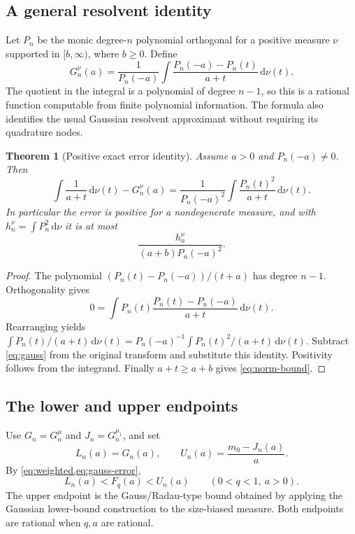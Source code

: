 \documentclass[11pt,a4paper]{article}
\newtheorem{theorem}{Theorem}[section]
\theoremstyle{remark}\newtheorem{remark}[theorem]{Remark}
\newcommand{\dd}{\,\mathrm d}
\begin{document}
\subsection{A general resolvent identity}

Let $P_n$ be the monic degree-$n$ polynomial orthogonal for a positive measure
$\nu$ supported in $[b,\infty)$, where $b\geq0$. Define
\begin{equation}
 G_n^{\nu}(a)=\frac1{P_n(-a)}
 \int\frac{P_n(-a)-P_n(t)}{a+t}\dd\nu(t).
 \label{eq:gauss}
\end{equation}
The quotient in the integral is a polynomial of degree $n-1$, so this is a
rational function computable from finite polynomial information. The formula
also identifies the usual Gaussian resolvent approximant without requiring
its quadrature nodes.

\begin{theorem}[Positive exact error identity]
Assume $a>0$ and $P_n(-a)\ne0$. Then
\begin{equation}
 \int\frac1{a+t}\dd\nu(t)-G_n^{\nu}(a)
 =\frac1{P_n(-a)^2}\int\frac{P_n(t)^2}{a+t}\dd\nu(t).
 \label{eq:gauss-error}
\end{equation}
In particular the error is positive for a nondegenerate measure, and with
$h_n^{\nu}=\int P_n^2\dd\nu$ it is at most
\begin{equation}
 \frac{h_n^{\nu}}{(a+b)P_n(-a)^2}.
 \label{eq:norm-bound}
\end{equation}
\end{theorem}
\begin{proof}
The polynomial $(P_n(t)-P_n(-a))/(t+a)$ has degree $n-1$. Orthogonality gives
\[
 0=\int P_n(t)\frac{P_n(t)-P_n(-a)}{a+t}\dd\nu(t).
\]
Rearranging yields
$\int P_n(t)/(a+t)\dd\nu(t)=
 P_n(-a)^{-1}\int P_n(t)^2/(a+t)\dd\nu(t)$.
Subtract \cref{eq:gauss} from the original transform and substitute this
identity. Positivity follows from the integrand. Finally $a+t\geq a+b$
gives \cref{eq:norm-bound}.
\end{proof}

\subsection{The lower and upper endpoints}

Use $G_n=G_n^{\mu}$ and $J_n=G_n^{\mu_1}$, and set
\begin{equation}
 L_n(a)=G_n(a),\qquad
 U_n(a)=\frac{m_0-J_n(a)}a.
 \label{eq:bounds}
\end{equation}
By \cref{eq:weighted,eq:gauss-error},
\begin{equation}
 L_n(a)<F_q(a)<U_n(a)\qquad(0<q<1,\ a>0).
 \label{eq:strict-enclosure}
\end{equation}
The upper endpoint is the Gauss/Radau-type bound obtained by applying the
Gaussian lower-bound construction to the size-biased measure. Both endpoints
are rational when $q,a$ are rational.
\end{document}
